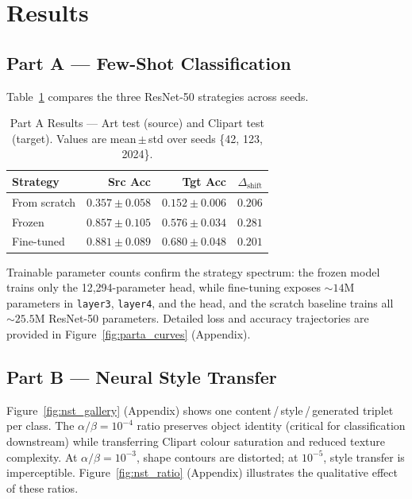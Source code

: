 \documentclass[conference]{IEEEtran}
\begin{document}
\section{Results}
\label{sec:results}

\subsection{Part A — Few-Shot Classification}

Table~\ref{tab:parta} compares the three ResNet-50 strategies across seeds.

\begin{table}[h]
\centering
\caption{Part A Results — Art test (source) and Clipart test (target).
         Values are mean\,$\pm$\,std over seeds \{42, 123, 2024\}.}
\label{tab:parta}
\begin{tabular}{lrrr}
\toprule
\textbf{Strategy} & \textbf{Src Acc} & \textbf{Tgt Acc} & \textbf{$\Delta_{\text{shift}}$} \\
\midrule
From scratch  & $0.357 \pm 0.058$ & $0.152 \pm 0.006$ & $0.206$ \\
Frozen        & $0.857 \pm 0.105$ & $0.576 \pm 0.034$ & $0.281$ \\
Fine-tuned    & $\mathbf{0.881 \pm 0.089}$ & $\mathbf{0.680 \pm 0.048}$ & $\mathbf{0.201}$ \\
\bottomrule
\end{tabular}
\end{table}

Trainable parameter counts confirm the strategy spectrum: the frozen model trains
only the 12{,}294-parameter head, while fine-tuning exposes ${\sim}14$M parameters
in \texttt{layer3}, \texttt{layer4}, and the head, and the scratch baseline
trains all ${\sim}25.5$M ResNet-50 parameters.
Detailed loss and accuracy trajectories are provided in
Figure~\ref{fig:parta_curves} (Appendix).
\subsection{Part B — Neural Style Transfer}

Figure~\ref{fig:nst_gallery} (Appendix) shows one content\,/\,style\,/\,generated
triplet per class.
The $\alpha/\beta = 10^{-4}$ ratio preserves object identity (critical for
classification downstream) while transferring Clipart colour saturation and
reduced texture complexity.
At $\alpha/\beta = 10^{-3}$, shape contours are distorted; at $10^{-5}$, style
transfer is imperceptible. Figure~\ref{fig:nst_ratio} (Appendix)
illustrates the qualitative effect of these ratios.
\end{document}
